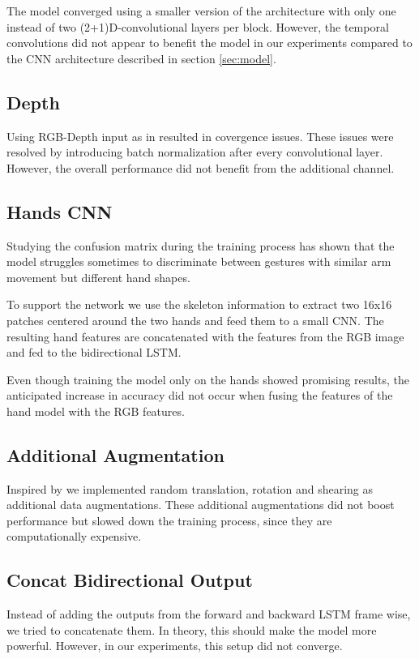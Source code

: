 The model converged using a smaller version of the architecture with only one instead of two (2+1)D-convolutional layers per block.
However, the temporal convolutions did not appear to benefit the model in our experiments compared to the CNN architecture described in section \ref{sec:model}.

\subsection{Depth}
Using RGB-Depth input as in \cite{Pigou16} resulted in covergence issues.
These issues were resolved by introducing batch normalization after every convolutional layer. However, the overall performance did not benefit from the additional channel.

\subsection{Hands CNN}
Studying the confusion matrix during the training process has shown that the model struggles sometimes to discriminate between gestures with similar arm movement but different hand shapes. 

To support the network we use the skeleton information to extract two 16x16 patches centered around the two hands and feed them to a small CNN. The resulting hand features are concatenated with the features from the RGB image and fed to the bidirectional LSTM.

Even though training the model only on the hands showed promising results, the anticipated increase in accuracy did not occur when fusing the features of the hand model with the RGB features.

\subsection{Additional Augmentation}
Inspired by \cite{Pigou16} we implemented random translation, rotation and shearing as additional data augmentations. These additional augmentations did not boost performance but slowed down the training process, since they are computationally expensive.

\subsection{Concat Bidirectional Output}
Instead of adding the outputs from the forward and backward LSTM frame wise, we tried to concatenate them.
In theory, this should make the model more powerful. However, in our experiments, this setup did not converge.

